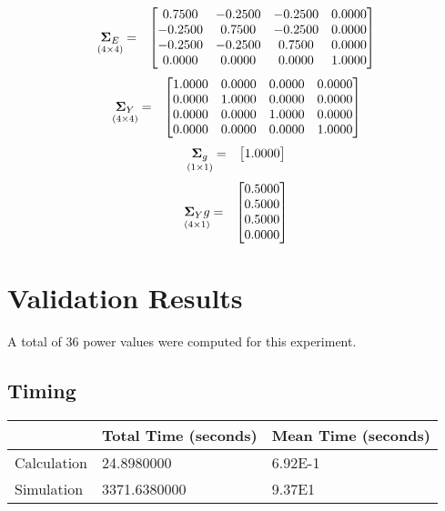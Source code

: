 \documentclass{glimmpse-report}
\begin{document}
\begin{eqnarray*}
\underset{\left(4\times4\right)}{\mathbf{\Sigma}_E} & = & \begin{bmatrix}0.7500 & -0.2500 & -0.2500 & 0.0000\protect\\
-0.2500 & 0.7500 & -0.2500 & 0.0000\protect\\
-0.2500 & -0.2500 & 0.7500 & 0.0000\protect\\
0.0000 & 0.0000 & 0.0000 & 1.0000\protect\\
\end{bmatrix}
\end{eqnarray*}
\begin{eqnarray*}
\underset{\left(4\times4\right)}{\mathbf{\Sigma}_Y} & = & \begin{bmatrix}1.0000 & 0.0000 & 0.0000 & 0.0000\protect\\
0.0000 & 1.0000 & 0.0000 & 0.0000\protect\\
0.0000 & 0.0000 & 1.0000 & 0.0000\protect\\
0.0000 & 0.0000 & 0.0000 & 1.0000\protect\\
\end{bmatrix}
\end{eqnarray*}
\begin{eqnarray*}
\underset{\left(1\times1\right)}{\mathbf{\Sigma}_g} & = & \begin{bmatrix}1.0000\protect\\
\end{bmatrix}
\end{eqnarray*}
\begin{eqnarray*}
\underset{\left(4\times1\right)}{\mathbf{\Sigma}_Yg} & = & \begin{bmatrix}0.5000\protect\\
0.5000\protect\\
0.5000\protect\\
0.0000\protect\\
\end{bmatrix}
\end{eqnarray*}
\section{Validation Results}
A total of 36 power values were computed for this experiment.

\subsection{Timing}
\begin{tabular}{|l|l|l|}
\hline
 & Total Time (seconds) & Mean Time (seconds) \\ 
\hline
Calculation & 24.8980000 & 6.92E-1\tabularnewline
\hline
Simulation & 3371.6380000 & 9.37E1\tabularnewline
\hline
\end{tabular}
\end{document}
